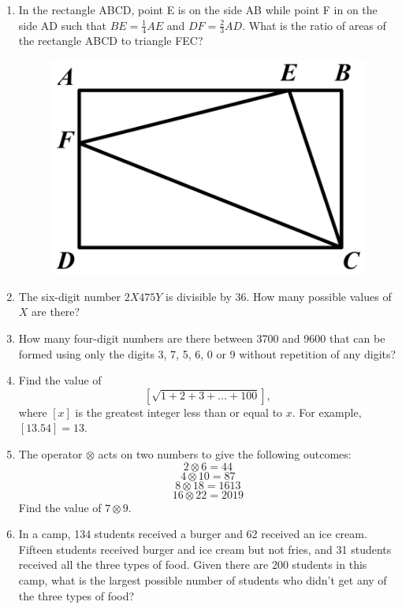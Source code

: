 \documentclass[11pt]{scrartcl}
\begin{document}
\begin{enumerate}
\item In the rectangle ABCD, point E is on the side AB while point F in on the side AD such that $BE = \frac{1}{4}AE$ and $DF = \frac{2}{3}AD$. What is the ratio of areas of the rectangle ABCD to triangle FEC?
\begin{figure}[h]
    \centering
    \includegraphics[scale=0.4]{Test For Pelatihan/rectangle.png}
\end{figure}

\item The six-digit number $2X475Y$ is divisible by 36. How many possible values of $X$ are there?

\item How many four-digit numbers are there between 3700 and 9600 that can be formed using only the digits 3, 7, 5, 6, 0 or 9 without repetition of any digits?

\item Find the value of 
\[\left[\sqrt{1 + 2 + 3 + \ldots + 100}\right],\]
where $[x]$ is the greatest integer less than or equal to $x$. For example, $[13.54] = 13$.

\item The operator $\otimes$ acts on two numbers to give the following outcomes:
\[2 \otimes 6 = 44\]
\[4 \otimes 10 = 87\]
\[8 \otimes 18 = 1613\]
\[16 \otimes 22 = 2019\]
Find the value of $7 \otimes 9$.

\item In a camp, 134 students received a burger and 62 received an ice cream. Fifteen students received burger and ice cream but not fries, and 31 students received all the three types of food. Given there are 200 students in this camp, what is the largest possible number of students who didn’t get any of the three types of food?
\end{enumerate}
\end{document}
